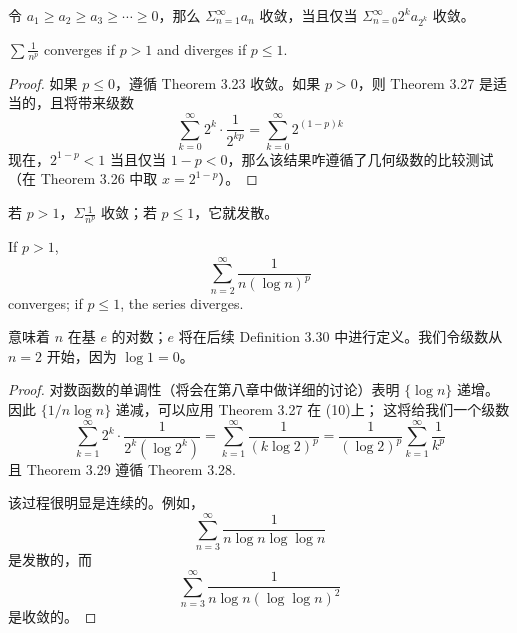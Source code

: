 \documentclass[../poma-notes.tex]{subfiles}
\begin{document}
\begin{anote}
  令 $a_1 \ge a_2 \ge a_3 \ge \cdots \ge 0$，那么 $\Sigma_{n=1}^{\infty} a_n$ 收敛，当且仅当 $\Sigma_{n=0}^{\infty}2^k a_{2^k}$ 收敛。
\end{anote}


\begin{theorem}
  $\sum \frac{1}{n^p}$ converges if $p > 1$ and diverges if $p \le 1$.
\end{theorem}

\begin{proof}
  如果 $p \le 0$，遵循 Theorem 3.23 收敛。如果 $p > 0$，则 Theorem 3.27 是适当的，且将带来级数
  \[ \sum_{k=0}^{\infty} 2^k \cdot \frac{1}{2^{kp}} = \sum_{k=0}^{\infty} 2^{(1-p)k} \]
  现在，$2^{1-p} < 1$ 当且仅当 $1-p < 0$，那么该结果咋遵循了几何级数的比较测试（在 Theorem 3.26 中取 $x = 2^{1-p}$）。
\end{proof}

\anote 若 $p>1$，$\Sigma\frac{1}{n^p}$ 收敛；若 $p\le1$，它就发散。


\begin{theorem}
  If $p > 1$,
  \begin{equation}
    \sum_{n=2}^{\infty} \frac{1}{n(\log n)^p}
  \end{equation}
  converges; if $p \le 1$, the series diverges.
\end{theorem}

\begin{remark}
   意味着 $n$ 在基 $e$ 的对数；$e$ 将在后续 Definition 3.30 中进行定义。我们令级数从 $n = 2$ 开始，因为 $\log 1 = 0$。
\end{remark}

\begin{proof}
  对数函数的单调性（将会在第八章中做详细的讨论）表明 $\{\log n\}$ 递增。因此 $\{1/n \log n\}$ 递减，可以应用 Theorem 3.27 在 (10)上；
  这将给我们一个级数
  \begin{equation}
    \sum_{k=1}^{\infty} 2^k \cdot \frac{1}{2^k(\log 2^k)} =
    \sum_{k=1}^{\infty} \frac{1}{(k \log 2)^p} =
    \frac{1}{(\log 2)^p} \sum_{k=1}^{\infty}\frac{1} {k^p}
  \end{equation}
  且 Theorem 3.29 遵循 Theorem 3.28.

  该过程很明显是连续的。例如，
  \begin{equation}
    \sum_{n=3}^{\infty} \frac{1}{n \log n \log \log n}
  \end{equation}
  是发散的，而
  \begin{equation}
    \sum_{n=3}^{\infty} \frac{1}{n \log n(\log \log n)^2}
  \end{equation}
  是收敛的。
\end{proof}

\end{document}
